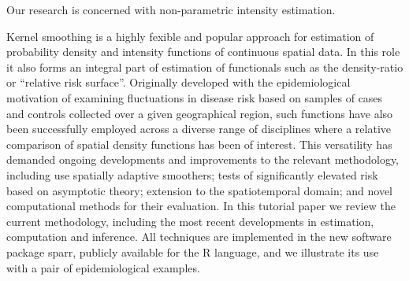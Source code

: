 

Our research is concerned with non-parametric intensity estimation.

Kernel smoothing is a highly fexible and popular approach for estimation of probability density and intensity functions of continuous spatial data. In this role it also forms an integral part of estimation of functionals such as the density-ratio or ``relative risk surface''. Originally developed with the epidemiological motivation of examining fluctuations in disease risk based on samples of cases and controls collected over a given geographical region, such functions have also been successfully employed across a diverse range of disciplines where a relative comparison of spatial density functions has been of interest. This versatility has demanded ongoing developments and improvements to the relevant methodology, including use spatially adaptive smoothers; tests of significantly elevated risk based on asymptotic theory; extension to the spatiotemporal domain; and novel computational methods for their evaluation. In this tutorial paper we review the current methodology, including the most recent developments in estimation, computation and inference. All techniques are implemented in the new software package sparr, publicly available for the R language, and we illustrate its use with a pair of epidemiological examples. \citep{davies2018tutorial}
